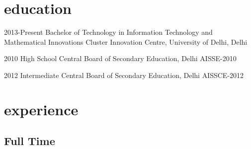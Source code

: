 \documentclass[]{devkhan-cv} %
\begin{document}

\section{education}

\begin{entrylist}


\entry
{2013-Present}
{Bachelor of Technology {\normalfont in Information Technology and Mathematical Innovations}}
{Cluster Innovation Centre, University of Delhi, Delhi}


\entry
{2010}
{High School}
{Central Board of Secondary Education, Delhi}
{AISSE-2010}


\entry
{2012}
{Intermediate}
{Central Board of Secondary Education, Delhi}
{AISSCE-2012}


\end{entrylist}


\section{experience}

\subsection{Full Time}
\end{document}
